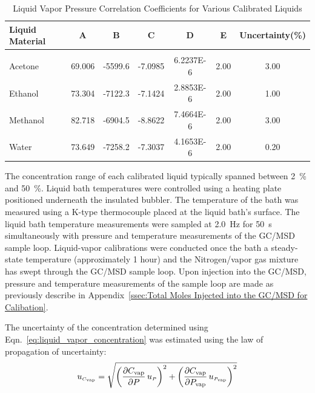 \documentclass[12pt]{article}
\begin{document}
\begin{table}[!]
\caption{Liquid Vapor Pressure Correlation Coefficients for Various Calibrated Liquids}
\label{tab:Liquid Calibrate_Table}
\centering
	\footnotesize
	\begin{tabular}{lcccccc}
			\hline
\textbf{Liquid Material} &\textbf{A}& \textbf{B}& \textbf{C}&\textbf{D}&\textbf{E}&\textbf{Uncertainty(\%)}\\
\hline
\\[0.001cm]
Acetone	&	69.006	&	-5599.6	&	-7.0985	&	6.2237E-6	& 	2.00	&  3.00\\
Ethanol	&	73.304	&	-7122.3	&	-7.1424	&	2.8853E-6	& 	2.00	&  1.00\\
Methanol	&	82.718	&	-6904.5	&	-8.8622	&	7.4664E-6	& 	2.00	&  3.00\\
Water		&	73.649	&	-7258.2	&	-7.3037	&	4.1653E-6	& 	2.00	&  0.20\\
\hline
\end{tabular}
\end{table}

The concentration range of each calibrated liquid typically spanned between 2~\% and 50~\%. Liquid bath temperatures were controlled using a heating plate positioned underneath the insulated bubbler. The temperature of the bath was measured using a K-type thermocouple placed at the liquid bath's surface. The liquid bath temperature measurements were sampled at \SI{2.0}{\hertz} for \SI{50}{s} simultaneously with pressure and temperature measurements of the GC/MSD sample loop. Liquid-vapor calibrations were conducted once the bath a steady-state temperature (approximately 1 hour) and the Nitrogen/vapor gas mixture has swept through the GC/MSD sample loop. Upon injection into the GC/MSD, pressure and temperature measurements of the sample loop are made as previously describe in Appendix~\ref{ssec:Total Moles Injected into the GC/MSD for Calibation}.

The uncertainty of the concentration determined using Eqn.~\ref{eq:liquid_vapor_concentration} was estimated using the law of propagation of uncertainty:
\begin{equation}
\label{eq:vapor_concentration_uncertainty}
u_{\scriptscriptstyle C_{\rm vap}} = \sqrt{{\left( \frac{\partial C_{\rm vap}}{\partial P}\,u_{\scriptscriptstyle P} \right) }^2+{\left(\frac{\partial C_{\rm vap}}{\partial P_{\rm vap}}\,u_{\scriptscriptstyle P_{\rm vap}}\right)}^2}
\end{equation}
\end{document}
